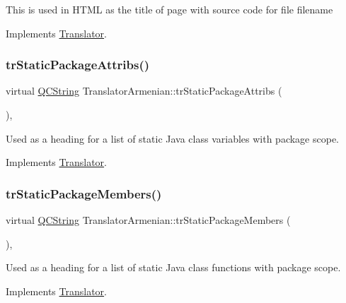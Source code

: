 This is used in H\+T\+ML as the title of page with source code for file filename 

Implements \mbox{\hyperlink{class_translator}{Translator}}.

\mbox{\label{class_translator_armenian_a3ed974b41a2ad4cc95645689ff4735dd}} 
\subsubsection{\texorpdfstring{trStaticPackageAttribs()}{trStaticPackageAttribs()}}
{\footnotesize\ttfamily virtual \mbox{\hyperlink{class_q_c_string}{Q\+C\+String}} Translator\+Armenian\+::tr\+Static\+Package\+Attribs (\begin{DoxyParamCaption}{ }\end{DoxyParamCaption})\hspace{0.3cm}{\ttfamily [inline]}, {\ttfamily [virtual]}}

Used as a heading for a list of static Java class variables with package scope. 

Implements \mbox{\hyperlink{class_translator}{Translator}}.

\mbox{\label{class_translator_armenian_a0fb6424d360da3d4a37b41aa5d20b5ad}} 
\subsubsection{\texorpdfstring{trStaticPackageMembers()}{trStaticPackageMembers()}}
{\footnotesize\ttfamily virtual \mbox{\hyperlink{class_q_c_string}{Q\+C\+String}} Translator\+Armenian\+::tr\+Static\+Package\+Members (\begin{DoxyParamCaption}{ }\end{DoxyParamCaption})\hspace{0.3cm}{\ttfamily [inline]}, {\ttfamily [virtual]}}

Used as a heading for a list of static Java class functions with package scope. 

Implements \mbox{\hyperlink{class_translator}{Translator}}.

